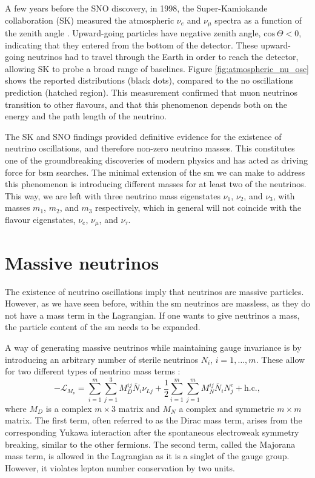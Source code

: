 A few years before the SNO discovery, in 1998, the Super-Kamiokande collaboration (SK) measured the atmospheric $\nu_{e}$ and $\nu_{\mu}$ spectra as a function of the zenith angle \cite{SuperKamiokande1998}. Upward-going particles have negative zenith angle, $\mathrm{cos}~\Theta < 0$, indicating that they entered from the bottom of the detector. These upward-going neutrinos had to travel through the Earth in order to reach the detector, allowing SK to probe a broad range of baselines. Figure \ref{fig:atmospheric_nu_osc} shows the reported distributions (black dots), compared to the no oscillations prediction (hatched region). This measurement confirmed that muon neutrinos transition to other flavours, and that this phenomenon depends both on the energy and the path length of the neutrino.

The SK and SNO findings provided definitive evidence for the existence of neutrino oscillations, and therefore non-zero neutrino masses. This constitutes one of the groundbreaking discoveries of modern physics and has acted as driving force for \gls{bsm} searches. The minimal extension of the \gls{sm} we can make to address this phenomenon is introducing different masses for at least two of the neutrinos. This way, we are left with three neutrino mass eigenstates $\nu_{1}$, $\nu_{2}$, and $\nu_{3}$, with masses $m_{1}$, $m_{2}$, and $m_{3}$ respectively, which in general will not coincide with the flavour eigenstates, $\nu_{e}$, $\nu_{\mu}$, and $\nu_{\tau}$.

\section{Massive neutrinos}\label{sec:nu_mass}

The existence of neutrino oscillations imply that neutrinos are massive particles. However, as we have seen before, within the \gls{sm} neutrinos are massless, as they do not have a mass term in the Lagrangian. If one wants to give neutrinos a mass, the particle content of the \gls{sm} needs to be expanded.

A way of generating massive neutrinos while maintaining gauge invariance is by introducing an arbitrary number of sterile neutrinos $N_{i}$, $i=1,\dots,m$. These allow for two different types of neutrino mass terms \cite{Gonzalez-Garcia2007}:
\begin{equation}\label{eq:nu_mass_lagrangian}
	-\mathcal{L}_{M_{\nu}} = \sum_{i=1}^{m} \sum_{j=1}^{3} M^{ij}_{D} \bar{N}_{i} \nu_{Lj} + \frac{1}{2} \sum_{i=1}^{m} \sum_{j=1}^{m} M^{ij}_{N} \bar{N}_{i} N^{c}_{j} + \mathrm{h.c.},
\end{equation}
where $M_{D}$ is a complex $m \times 3$ matrix and $M_{N}$ a complex and symmetric $m \times m$ matrix. The first term, often referred to as the Dirac mass term, arises from the corresponding Yukawa interaction after the spontaneous electroweak symmetry breaking, similar to the other fermions. The second term, called the Majorana mass term, is allowed in the Lagrangian as it is a singlet of the gauge group. However, it violates lepton number conservation by two units.

